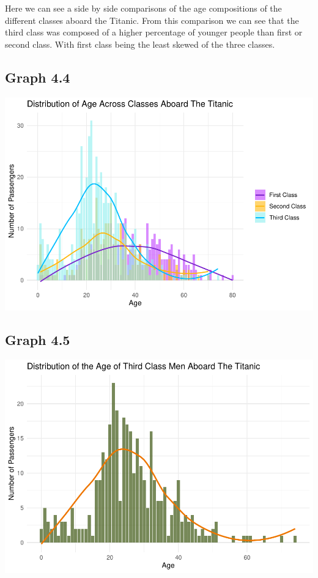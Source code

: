 \documentclass[
  11pt,
]{article}
\begin{document}
Here we can see a side by side comparisons of the age compositions of
the different classes aboard the Titanic. From this comparison we can
see that the third class was composed of a higher percentage of younger
people than first or second class. With first class being the least
skewed of the three classes.

\hypertarget{graph-4.4}{%
\subsection{Graph 4.4}\label{graph-4.4}}

\includegraphics{README_files/figure-latex/unnamed-chunk-5-1.pdf}

\hypertarget{graph-4.5}{%
\subsection{Graph 4.5}\label{graph-4.5}}

\includegraphics{README_files/figure-latex/unnamed-chunk-6-1.pdf}
\end{document}
